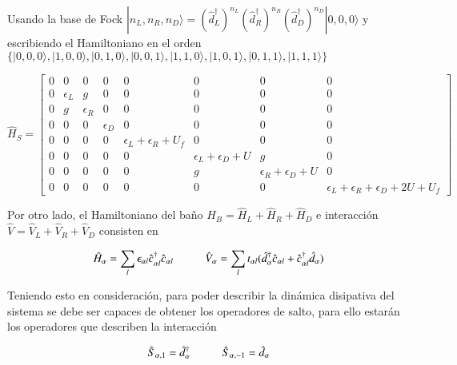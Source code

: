 Usando la base de Fock $|n_{L},n_{R},n_{D} \rangle = (\hat{d}^{\dagger}_{L})^{n_{L}}(\hat{d}^{\dagger}_{R})^{n_{R}}(\hat{d}^{\dagger}_{D})^{n_{D}}|0,0,0\rangle$ y escribiendo el Hamiltoniano en el orden 
$\{|0,0,0\rangle, |1,0,0\rangle, |0,1,0\rangle, |0,0,1\rangle, |1,1,0\rangle, |1,0,1\rangle, |0,1,1\rangle, |1,1,1\rangle\}$ 

\begin{equation*}
    \hat{H}_{S} = 
    \begin{bmatrix}
        0 & 0 & 0 & 0 & 0 & 0 & 0 & 0 \\
        0 & \epsilon_{L} & g & 0 & 0 & 0 & 0 & 0 \\
        0 & g & \epsilon_{R} & 0 & 0 & 0 & 0 & 0 \\
        0 & 0 & 0 & \epsilon_{D} & 0 & 0 & 0 & 0 \\
        0 & 0 & 0 & 0 & \epsilon_{L} + \epsilon_{R}  + U_{f} & 0 & 0 & 0 \\
        0 & 0 & 0 & 0 & 0 & \epsilon_{L} + \epsilon_{D} + U & g & 0 \\
        0 & 0 & 0 & 0 & 0 & g & \epsilon_{R} + \epsilon_{D} + U & 0 \\
        0 & 0 & 0 & 0 & 0 & 0 & 0 & \epsilon_{L} + \epsilon_{R}  + \epsilon_{D} + 2U + U_{f} 
        \end{bmatrix}
\end{equation*}

Por otro lado, el Hamiltoniano del baño $\hat{H}_{B} = \hat{H}_{L} + \hat{H}_{R} + \hat{H}_{D}$ e interacción $\hat{V} = \hat{V}_{L} + \hat{V}_{R} + \hat{V}_{D}$ consisten en

\begin{equation*}
    \hat{H}_{\alpha} = \sum_{l} \epsilon_{\alpha l} \hat{c}^{\dagger}_{\alpha l}\hat{c}_{\alpha l} \hspace{10mm} \hat{V}_{\alpha} = \sum_{l} t_{\alpha l} ( \hat{d}^{\dagger}_{\alpha} \hat{c}_{\alpha l} + \hat{c}^{\dagger}_{\alpha l} \hat{d}_{\alpha} )
\end{equation*}

Teniendo esto en consideración, para poder describir la dinámica disipativa del sistema se debe ser capaces de obtener los operadores de salto, para ello estarán los operadores que describen la interacción

\begin{equation*}
    \hat{S}_{\alpha,1} = \hat{d}^{\dagger}_{\alpha} \hspace{10mm} \hat{S}_{\alpha,-1} = \hat{d}_{\alpha}
\end{equation*}

